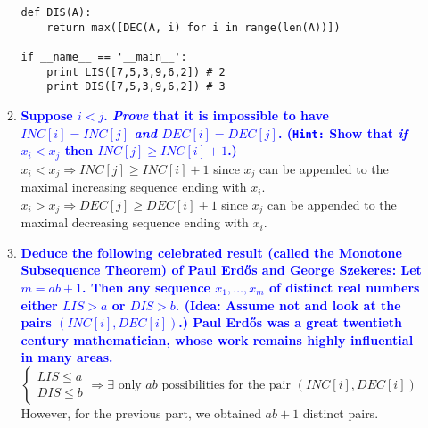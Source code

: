 \documentclass[11pt]{article}
\begin{document}
\begin{enumerate}
\begin{enumerate}
\begin{verbatim}
def DIS(A):
    return max([DEC(A, i) for i in range(len(A))])

if __name__ == '__main__':
    print LIS([7,5,3,9,6,2]) # 2
    print DIS([7,5,3,9,6,2]) # 3
        \end{verbatim}
        
    \item \textbf{\textcolor{blue}{Suppose $i<j$.  {\em Prove} that it is impossible to have $INC[i]=INC[j]$ {\em and} $DEC[i]=DEC[j]$.  ({\tt Hint:} Show that {\em if} $x_i < x_j$ then $INC[j] \geq INC[i] + 1$.)}}
        \\ $x_i < x_j \Rightarrow INC[j] \geq INC[i] + 1$ since $x_j$ can be appended to the maximal increasing sequence ending with $x_i$. 
        \\ $x_i > x_j \Rightarrow DEC[j] \geq DEC[i] + 1$ since $x_j$ can be appended to the maximal decreasing sequence ending with $x_i$. 
    \item \textbf{\textcolor{blue}{Deduce the following celebrated result (called the Monotone Subsequence Theorem) of Paul Erd\H{o}s and George Szekeres:  Let $m=ab+1$.  Then any sequence $x_1,\ldots,x_m$ of distinct real numbers either $LIS>a$ or $DIS>b$.  (Idea: Assume not and look at the pairs $(INC[i],DEC[i])$.)  Paul Erd\H{o}s was a great twentieth century mathematician,  whose work remains highly influential in many areas.}}
        \\ $\left\{
                \begin{array}{ll}
                    LIS \leq a \\
                    DIS \leq b
                \end{array}
            \right. \Rightarrow \exists \mbox{ only } ab \mbox{ possibilities for the pair }(INC[i], DEC[i])$
        \\ However, for the previous part, we obtained $ab + 1$ distinct pairs.
        
        
        
    \end{enumerate}
    

\end{enumerate}
\end{document}
